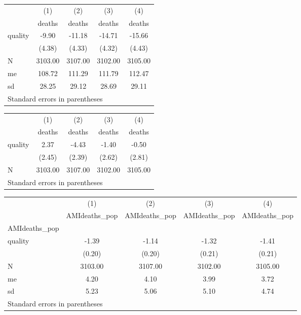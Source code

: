 \begin{tabular}{l*{4}{c}}
\hline\hline
            &\multicolumn{1}{c}{(1)}&\multicolumn{1}{c}{(2)}&\multicolumn{1}{c}{(3)}&\multicolumn{1}{c}{(4)}\\
            &\multicolumn{1}{c}{deaths}&\multicolumn{1}{c}{deaths}&\multicolumn{1}{c}{deaths}&\multicolumn{1}{c}{deaths}\\
\hline
quality     &       -9.90&      -11.18&      -14.71&      -15.66\\
            &      (4.38)&      (4.33)&      (4.32)&      (4.43)\\
\hline
N           &     3103.00&     3107.00&     3102.00&     3105.00\\
me          &      108.72&      111.29&      111.79&      112.47\\
sd          &       28.25&       29.12&       28.69&       29.11\\
\hline\hline
\multicolumn{5}{l}{\footnotesize Standard errors in parentheses}\\
\end{tabular}
\begin{tabular}{l*{4}{c}}
\hline\hline
            &\multicolumn{1}{c}{(1)}&\multicolumn{1}{c}{(2)}&\multicolumn{1}{c}{(3)}&\multicolumn{1}{c}{(4)}\\
            &\multicolumn{1}{c}{deaths}&\multicolumn{1}{c}{deaths}&\multicolumn{1}{c}{deaths}&\multicolumn{1}{c}{deaths}\\
\hline
quality     &        2.37&       -4.43&       -1.40&       -0.50\\
            &      (2.45)&      (2.39)&      (2.62)&      (2.81)\\
\hline
N           &     3103.00&     3107.00&     3102.00&     3105.00\\
\hline\hline
\multicolumn{5}{l}{\footnotesize Standard errors in parentheses}\\
\end{tabular}
\begin{tabular}{l*{4}{c}}
\hline\hline
            &\multicolumn{1}{c}{(1)}&\multicolumn{1}{c}{(2)}&\multicolumn{1}{c}{(3)}&\multicolumn{1}{c}{(4)}\\
            &\multicolumn{1}{c}{AMIdeaths\_pop}&\multicolumn{1}{c}{AMIdeaths\_pop}&\multicolumn{1}{c}{AMIdeaths\_pop}&\multicolumn{1}{c}{AMIdeaths\_pop}\\
\hline
AMIdeaths\_pop&            &            &            &            \\
quality     &       -1.39&       -1.14&       -1.32&       -1.41\\
            &      (0.20)&      (0.20)&      (0.21)&      (0.21)\\
\hline
N           &     3103.00&     3107.00&     3102.00&     3105.00\\
me          &        4.20&        4.10&        3.99&        3.72\\
sd          &        5.23&        5.06&        5.10&        4.74\\
\hline\hline
\multicolumn{5}{l}{\footnotesize Standard errors in parentheses}\\
\end{tabular}
